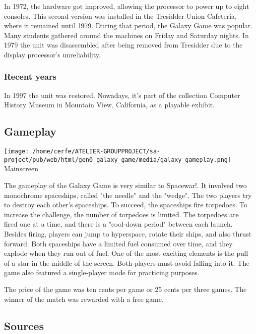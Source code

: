 \documentclass[a4paper,10pt]{book}
\begin{document}
 In 1972, the hardware got improved, allowing the processor to power up to eight consoles. This second version was installed in the Tresidder Union Cafeteria, where it remained until 1979. 
             During that period, the Galaxy Game was popular. Many students gathered around the machines on Friday and Saturday nights. In 1979 the unit was disassembled after being removed from Tresidder due to the display processor's unreliability.
           
 \subsubsection{Recent years }
 In 1997 the unit was restored. Nowadays, it's part of the collection Computer History Museum in Mountain View, California, as a playable exhibit. 
 
 \subsection{Gameplay }
 
 \texttt{[image: /home/cerfe/ATELIER-GROUPPROJECT/sa-project/pub/web/html/gen0\_galaxy\_game/media/galaxy\_gameplay.png]}
 Mainscreen 
 
 
            The gameplay of the Galaxy Game is very similar to Spacewar!. It involved two monochrome spaceships, called "the needle" and the "wedge". The two players try to destroy each other's spaceships. To succeed, the spaceships fire torpedoes. To increase the challenge, the number of torpedoes is limited. The torpedoes are fired one at a time, and there is a "cool-down period" between each launch. 
            Besides firing, players can jump to hyperspace, rotate their ships, and also thrust forward. Both spaceships have a limited fuel consumed over time, and they explode when they run out of fuel. 
            One of the most exciting elements is the pull of a star in the middle of the screen. Both players must avoid falling into it. 
            The game also featured a single-player mode for practicing purposes. 
 
 The price of the game was ten cents per game or 25 cents per three games. The winner of the match was rewarded with a free game. 
 
 
 
 \subsection{Sources }
 
\end{document}
